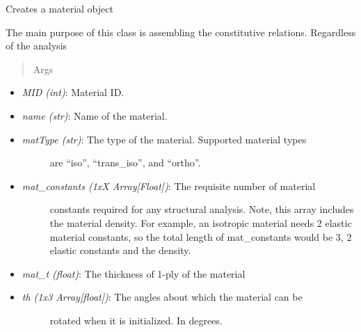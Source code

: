 \documentclass[letterpaper,10pt,english]{sphinxmanual}
\begin{document}
\begin{fulllineitems}
\begin{fulllineitems}
\label{structures:AeroComBAT.Structures.Material.__init__}
Creates a material object

The main purpose of this class is assembling the constitutive
relations. Regardless of the analysis
\begin{quote}\begin{description}
\item[{Args}] \leavevmode
\end{description}\end{quote}
\begin{itemize}
\item {} 
\emph{MID (int)}: Material ID.

\item {} 
\emph{name (str)}: Name of the material.

\item {} \begin{description}
\item[{\emph{matType (str)}: The type of the material. Supported material types}] \leavevmode
are ``iso'', ``trans\_iso'', and ``ortho''.

\end{description}

\item {} \begin{description}
\item[{\emph{mat\_constants (1xX Array{[}Float{]})}: The requisite number of material}] \leavevmode
constants required for any structural analysis. Note, this
array includes the material density. For example, an isotropic
material needs 2 elastic material constants, so the total
length of mat\_constants would be 3, 2 elastic constants and the
density.

\end{description}

\item {} 
\emph{mat\_t (float)}: The thickness of 1-ply of the material

\item {} \begin{description}
\item[{\emph{th (1x3 Array{[}float{]})}: The angles about which the material can be}] \leavevmode
rotated when it is initialized. In degrees.

\end{description}


\end{itemize}
\end{fulllineitems}
\end{fulllineitems}
\end{document}
